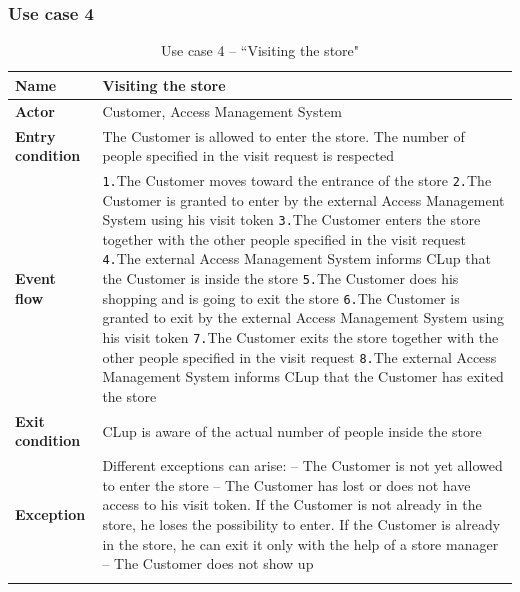 \documentclass[a4paper,oneside,11pt]{book}   %
\begin{document}
    \subsubsection{Use case 4}
    \begin{longtable}[c] { |>{\bfseries{}}C{0.25\textwidth}|H{0.55\textwidth}| }
        \hline
        Name            & Visiting the store \\ \hline
        Actor           & Customer, Access Management System \\ \hline
        Entry condition & The Customer is allowed to enter the store. The number of people specified in the visit request is respected  \\ \hline
        Event flow      & 
        \texttt{1.}The Customer moves toward the entrance of the store \newline
        \texttt{2.}The Customer is granted to enter by the external Access Management System using his visit token \newline
        \texttt{3.}The Customer enters the store together with the other people specified in the visit request \newline
        \texttt{4.}The external Access Management System informs CLup that the Customer is inside the store \newline
        \texttt{5.}The Customer does his shopping and is going to exit the store \newline
        \texttt{6.}The Customer is granted to exit by the external Access Management System using his visit token \newline
        \texttt{7.}The Customer exits the store together with the other people specified in the visit request \newline
        \texttt{8.}The external Access Management System informs CLup that the Customer has exited the store
        \\ \hline
        Exit condition  & CLup is aware of the actual number of people inside the store \\ \hline
        Exception       & Different exceptions can arise: \newline
        -- The Customer is not yet allowed to enter the store \newline
        -- The Customer has lost or does not have access to his visit token. If the Customer is not already in the store, he loses the possibility to enter. If the Customer is already in the store, he can exit it only with the help of a store manager \newline
        -- The Customer does not show up \\
        \hline
    \caption{Use case 4 -- ``Visiting the store"}
    \label{table:use_case_04}
    \end{longtable}
    
\end{document}
